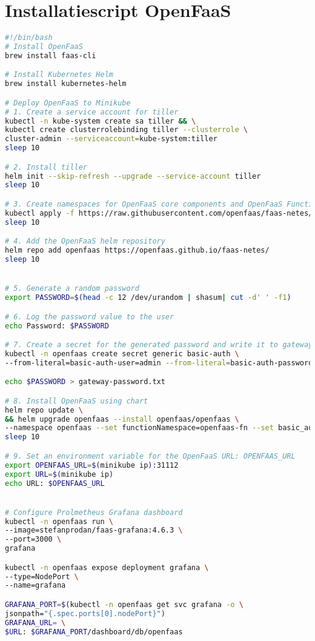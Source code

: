\section{Installatiescript OpenFaaS}
\label{sec:installatie-openfaas}
\begin{lstlisting}[language=bash]
#!/bin/bash
# Install OpenFaaS
brew install faas-cli

# Install Kubernetes Helm
brew install kubernetes-helm

# Deploy OpenFaaS to Minikube
# 1. Create a service account for tiller
kubectl -n kube-system create sa tiller && \
kubectl create clusterrolebinding tiller --clusterrole \
cluster-admin --serviceaccount=kube-system:tiller
sleep 10

# 2. Install tiller
helm init --skip-refresh --upgrade --service-account tiller
sleep 10

# 3. Create namespaces for OpenFaaS core components and OpenFaaS Functions
kubectl apply -f https://raw.githubusercontent.com/openfaas/faas-netes/master/namespaces.yml
sleep 10

# 4. Add the OpenFaaS helm repository
helm repo add openfaas https://openfaas.github.io/faas-netes/
sleep 10


# 5. Generate a random password
export PASSWORD=$(head -c 12 /dev/urandom | shasum| cut -d' ' -f1)

# 6. Log the password value to the user
echo Password: $PASSWORD

# 7. Create a secret for the generated password and write it to gateway-password.txt
kubectl -n openfaas create secret generic basic-auth \
--from-literal=basic-auth-user=admin --from-literal=basic-auth-password="$PASSWORD"

echo $PASSWORD > gateway-password.txt

# 8. Install OpenFaaS using chart
helm repo update \
&& helm upgrade openfaas --install openfaas/openfaas \
--namespace openfaas --set functionNamespace=openfaas-fn --set basic_auth=true
sleep 10

# 9. Set an environment variable for the OpenFaaS URL: OPENFAAS_URL
export OPENFAAS_URL=$(minikube ip):31112
export URL=$(minikube ip)
echo URL: $OPENFAAS_URL


# Configure Prolmetheus Grafana dashboard
kubectl -n openfaas run \
--image=stefanprodan/faas-grafana:4.6.3 \
--port=3000 \
grafana

kubectl -n openfaas expose deployment grafana \
--type=NodePort \
--name=grafana

GRAFANA_PORT=$(kubectl -n openfaas get svc grafana -o \
jsonpath="{.spec.ports[0].nodePort}")
GRAFANA_URL= \
$URL: $GRAFANA_PORT/dashboard/db/openfaas
\end{lstlisting}